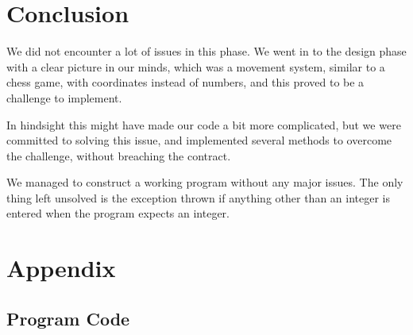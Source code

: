\documentclass[12pt, a4paper]{article}
\begin{document}
\section{Conclusion}
We did not encounter a lot of issues in this phase. We went in to the design phase with a clear picture in our minds, which was a movement system, similar to a chess game, with coordinates instead of numbers, and this proved to be a challenge to implement.

In hindsight this might have made our code a bit more complicated, but we were committed to solving this issue, and implemented several methods to overcome the challenge, without breaching the contract.

We managed to construct a working program without any major issues. The only thing left unsolved is the exception thrown if anything other than an integer is entered when the program expects an integer.

\newpage

\section{Appendix}
\subsection{Program Code}

\end{document}
